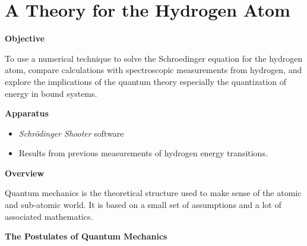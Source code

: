 \setcounter{equation}{0}
\setcounter{figure}{0}

\section{A Theory for the Hydrogen Atom}

\makelabheader %

\textbf{Objective}

To use a numerical technique to solve the Schroedinger equation for the hydrogen atom,
compare calculations with spectroscopic measurements from hydrogen,
 and explore
the implications of the quantum theory especially the quantization of energy
in bound systems.

\textbf{Apparatus}

\begin{itemize}

\item {\it Schr\"odinger Shooter} software

\item Results from previous measurements of hydrogen energy transitions.

\end{itemize}

\textbf{Overview}

Quantum mechanics is the theoretical structure used to make sense of the atomic and sub-atomic
world. 
It is based on a small set of assumptions and a lot of associated mathematics.

\begin{center}
\bf The Postulates of Quantum Mechanics
\end{center}

